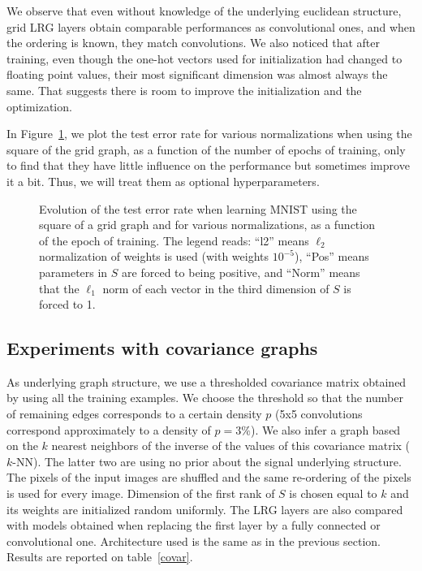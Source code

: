 We observe that even without knowledge of the underlying euclidean structure, grid LRG layers obtain comparable performances as convolutional ones, and when the ordering is known, they match convolutions. We also noticed that after training, even though the one-hot vectors used for initialization had changed to floating point values, their most significant dimension was almost always the same. That suggests there is room to improve the initialization and the optimization.

In Figure~\ref{functionofepoch}, we plot the test error rate for various normalizations when using the square of the grid graph, as a function of the number of epochs of training, only to find that they have little influence on the performance but sometimes improve it a bit. Thus, we will treat them as optional hyperparameters.

\begin{figure}[H]
  \begin{center}
    
  \end{center}
  \caption{Evolution of the test error rate when learning MNIST using the square of a grid graph and for various normalizations, as a function of the epoch of training. The legend reads: ``l2'' means $\ell_2$ normalization of weights is used (with weights $10^{-5}$), ``Pos'' means parameters in $S$ are forced to being positive, and ``Norm'' means that the $\ell_1$ norm of each vector in the third dimension of $S$ is forced to 1.}
  \label{functionofepoch}
\end{figure}

\subsection{Experiments with covariance graphs}

As underlying graph structure, we use a thresholded covariance matrix obtained by using all the training examples. We choose the threshold so that the number of remaining edges corresponds to a certain density $p$ (5x5 convolutions correspond approximately to a density of $p=3\%$). We also infer a graph based on the $k$ nearest neighbors of the inverse of the values of this covariance matrix ($k$-NN). The latter two are using no prior about the signal underlying structure. The pixels of the input images are shuffled and the same re-ordering of the pixels is used for every image. Dimension of the first rank of $S$ is chosen equal to $k$ and its weights are initialized random uniformly.
The LRG layers are also compared with models obtained when replacing the first layer by a fully connected or convolutional one. Architecture used is the same as in the previous section. Results are reported on table~\ref{covar}.


